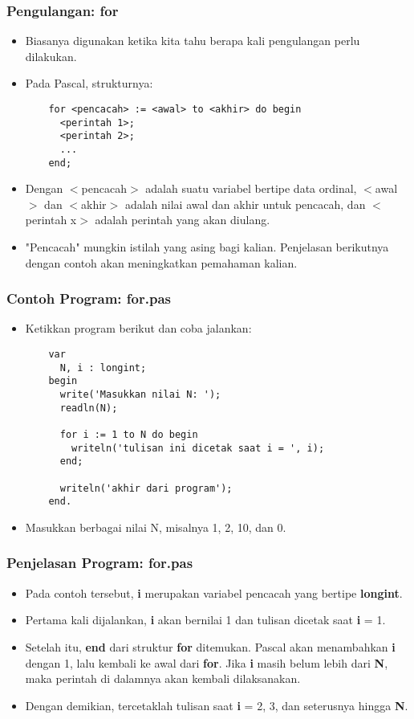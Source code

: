 \documentclass{beamer}
\begin{document}
\begin{frame}[fragile]
\frametitle{Pengulangan: for}
\begin{itemize}
  \item Biasanya digunakan ketika kita tahu berapa kali pengulangan perlu dilakukan.
  \item Pada Pascal, strukturnya:
  \begin{lstlisting}
    for <pencacah> := <awal> to <akhir> do begin
      <perintah 1>;
      <perintah 2>;
      ...
    end;
  \end{lstlisting}
  \item Dengan $<$pencacah$>$ adalah suatu variabel bertipe data \alert{ordinal}, $<$awal$>$ dan $<$akhir$>$ adalah nilai awal dan akhir untuk pencacah, dan $<$perintah x$>$ adalah perintah yang akan diulang.
  \item "Pencacah" mungkin istilah yang asing bagi kalian. Penjelasan berikutnya dengan contoh akan meningkatkan pemahaman kalian.
\end{itemize}
\end{frame}

\begin{frame}[fragile]
\frametitle{Contoh Program: for.pas}
\begin{itemize}
  \item Ketikkan program berikut dan coba jalankan:
  \begin{lstlisting}
    var
      N, i : longint;
    begin
      write('Masukkan nilai N: ');
      readln(N);

      for i := 1 to N do begin
        writeln('tulisan ini dicetak saat i = ', i);
      end;

      writeln('akhir dari program');
    end.
  \end{lstlisting}
  \item Masukkan berbagai nilai N, misalnya 1, 2, 10, dan 0.
\end{itemize}
\end{frame}

\begin{frame}
\frametitle{Penjelasan Program: for.pas}
\begin{itemize}
  \item Pada contoh tersebut, \textbf{i} merupakan variabel pencacah yang bertipe \textbf{longint}.
  \item Pertama kali dijalankan, \textbf{i} akan bernilai 1 dan tulisan dicetak saat \textbf{i} = 1.
  \item Setelah itu, \textbf{end} dari struktur \textbf{for} ditemukan. Pascal akan menambahkan \textbf{i} dengan 1, lalu kembali ke awal dari \textbf{for}. Jika \textbf{i} masih belum lebih dari \textbf{N}, maka perintah di dalamnya akan kembali dilaksanakan.
  \item Dengan demikian, tercetaklah tulisan saat \textbf{i} = 2, 3, dan seterusnya hingga \textbf{N}.
\end{itemize}
\end{frame}
\end{document}
